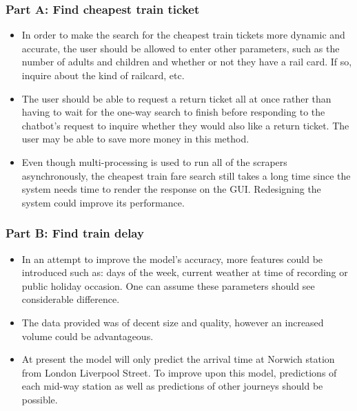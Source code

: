 \subsubsection{Part A: Find cheapest train ticket}
\begin{itemize}
    \item In order to make the search for the cheapest train tickets more dynamic and accurate, the user should be allowed to enter other parameters, such as the number of adults and children and whether or not they have a rail card. If so, inquire about the kind of railcard, etc.
    \item The user should be able to request a return ticket all at once rather than having to wait for the one-way search to finish before responding to the chatbot's request to inquire whether they would also like a return ticket. The user may be able to save more money in this method.
    \item Even though multi-processing is used to run all of the scrapers asynchronously, the cheapest train fare search still takes a long time since the system needs time to render the response on the GUI. Redesigning the system could improve its performance.
\end{itemize}

\subsubsection{Part B: Find train delay}
\begin{itemize}
    \item In an attempt to improve the model's accuracy, more features could be introduced such as: days of the week, current weather at time of recording or public holiday occasion. One can assume these parameters should see considerable difference.
    \item The data provided was of decent size and quality, however an increased volume could be advantageous.
    \item At present the model will only predict the arrival time at Norwich station from London Liverpool Street. To improve upon this model, predictions of each mid-way station as well as predictions of other journeys should be possible.
\end{itemize}

